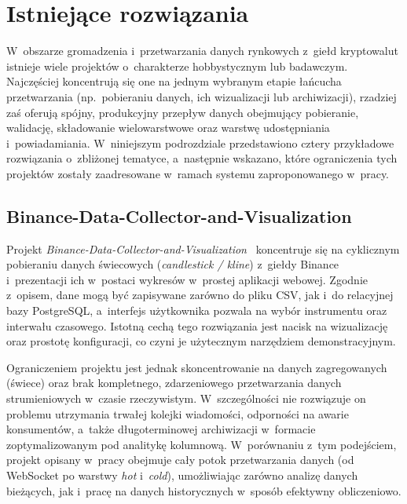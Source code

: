 \section{Istniejące rozwiązania}
\label{sec:istniejace_rozwiazania}

W~obszarze gromadzenia i~przetwarzania danych rynkowych z~giełd kryptowalut istnieje wiele projektów o~charakterze
hobbystycznym lub badawczym.
Najczęściej koncentrują się one na jednym wybranym etapie łańcucha przetwarzania (np.\ pobieraniu danych, ich
wizualizacji lub archiwizacji), rzadziej zaś oferują spójny, produkcyjny przepływ danych obejmujący pobieranie,
walidację, składowanie wielowarstwowe oraz warstwę udostępniania i~powiadamiania.
W~niniejszym podrozdziale przedstawiono cztery przykładowe rozwiązania o~zbliżonej tematyce, a~następnie wskazano,
które ograniczenia tych projektów zostały zaadresowane w~ramach systemu zaproponowanego w~pracy.

\subsection{Binance-Data-Collector-and-Visualization}
\label{subsec:binance-data-collector-and-visualization}

Projekt \textit{Binance-Data-Collector-and-Visualization}~\cite{github_binance_data_collector_visualization}
koncentruje się na cyklicznym pobieraniu danych świecowych (\textit{candlestick / kline}) z~giełdy
Binance i~prezentacji ich w~postaci wykresów w~prostej aplikacji webowej.
Zgodnie z~opisem, dane mogą być zapisywane zarówno do pliku CSV, jak i~do relacyjnej bazy PostgreSQL, a~interfejs
użytkownika pozwala na wybór instrumentu oraz interwału czasowego.
Istotną cechą tego rozwiązania jest nacisk na wizualizację oraz prostotę konfiguracji, co czyni je użytecznym
narzędziem demonstracyjnym.

Ograniczeniem projektu jest jednak skoncentrowanie na danych zagregowanych (świece) oraz brak kompletnego,
zdarzeniowego przetwarzania danych strumieniowych w~czasie rzeczywistym.
W~szczególności nie rozwiązuje on problemu utrzymania trwałej kolejki wiadomości, odporności na awarie konsumentów,
a~także długoterminowej archiwizacji w~formacie zoptymalizowanym pod analitykę kolumnową.
W~porównaniu z~tym podejściem, projekt opisany w~pracy obejmuje cały potok przetwarzania danych (od WebSocket po warstwy
\textit{hot} i~\textit{cold}), umożliwiając zarówno analizę danych bieżących, jak i~pracę na danych historycznych
w~sposób efektywny obliczeniowo.

